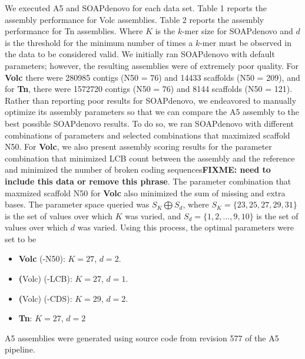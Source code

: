 \documentclass{bioinfo}
\begin{document}
We executed A5 and SOAPdenovo for each data set. Table 1 reports the assembly performance for Volc assemblies.
Table 2 reports the assembly performance for Tn assemblies. 
Where $K$ is the $k$-mer size for SOAPdenovo and $d$ is the threshold for the minimum number of times a $k$-mer must be observed in the data to be considered valid.
We initially ran SOAPdenovo with default parameters; however, the resulting assemblies were of extremely poor quality. For \textbf{Volc} there were
280985 contigs (N50 = 76) and 14433 scaffolds (N50 = 209), and for \textbf{Tn}, there were 1572720 contigs (N50 = 76) and 8144 scaffolds (N50 = 121). 
Rather than reporting poor results for SOAPdenovo, we endeavored to manually optimize its assembly parameters so that we can compare the A5 assembly to the best possible SOAPdenovo results. 
To do so, we ran SOAPdenovo with different combinations of parameters and selected combinations that maximized scaffold N50. For \textbf{Volc},
we also present assembly scoring results for the parameter combination that minimized LCB count between the assembly and the reference and minimized
the number of broken coding sequences\textbf{FIXME: need to include this data or remove this phrase}. The parameter combination that maxmized scaffold N50 for \textbf{Volc} also minimized the sum
of missing and extra bases. The parameter space queried was $S_K \bigoplus S_d$,
where $S_K = \{23,25,27,29,31\}$ is the set of values over which $K$ was varied, and $S_d = \{1,2,...,9,10\}$ is the set of values over which $d$
was varied. Using this process, the optimal parameters were set to be
\begin{itemize}
\item \textbf{Volc} (-N50): $K = 27$, $d = 2$.
\item \textbf(Volc) (-LCB): $K = 27$, $d = 1$.
\item \textbf(Volc) (-CDS): $K = 29$, $d = 2$.
\item \textbf{Tn}: $K = 27$, $d = 2$
\end{itemize}

A5 assemblies were generated using source code from revision 577 of the A5 pipeline.
\end{document}
